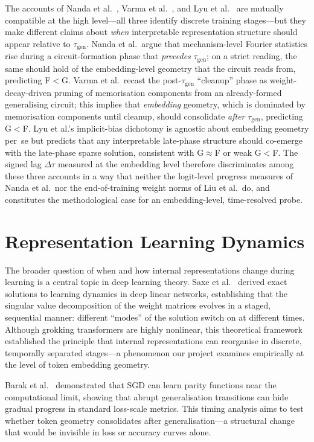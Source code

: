 \documentclass[12pt,openany,a4paper]{book}
\newcommand{\taug}{\tau_{\mathrm{gen}}}
\newcommand{\Dtau}{\Delta\tau}
\begin{document}
The accounts of Nanda et al.\ \cite{nanda2023progress},
Varma et al.\ \cite{varma2023explaining}, and
Lyu et al.\ \cite{lyu2024dichotomy} are mutually compatible at the
high level---all three identify discrete training stages---but they
make different claims about \emph{when} interpretable representation
structure should appear relative to $\taug$.
Nanda et al.\ argue that mechanism-level Fourier statistics rise
during a circuit-formation phase that \emph{precedes} $\taug$;
on a strict reading, the same should hold of the embedding-level
geometry that the circuit reads from, predicting F$<$G.
Varma et al.\ recast the post-$\taug$ ``cleanup'' phase as
weight-decay-driven pruning of memorisation components from an
already-formed generalising circuit; this implies that
\emph{embedding} geometry, which is dominated by memorisation
components until cleanup, should consolidate \emph{after} $\taug$,
predicting G$<$F.
Lyu et al.'s implicit-bias dichotomy is agnostic about embedding
geometry per~se but predicts that any interpretable late-phase
structure should co-emerge with the late-phase sparse solution,
consistent with G$\approx$F or weak G$<$F.
The signed lag $\Dtau$ measured at the embedding level therefore
discriminates among these three accounts in a way that neither the
logit-level progress measures of Nanda et al.\ nor the
end-of-training weight norms of Liu et al.\ do, and constitutes
the methodological case for an embedding-level, time-resolved probe.

\section{Representation Learning Dynamics}

The broader question of when and how internal representations change
during learning is a central topic in deep learning theory.
Saxe et al.\ \cite{saxe2014exact} derived exact solutions to learning
dynamics in deep linear networks, establishing that the singular
value decomposition of the weight matrices evolves in a staged,
sequential manner: different ``modes'' of the solution switch on at
different times.
Although grokking transformers are highly nonlinear, this theoretical
framework established the principle that internal representations
can reorganise in discrete, temporally separated stages---a
phenomenon our project examines empirically at the level of token
embedding geometry.

Barak et al.\ \cite{barak2022hidden} demonstrated that SGD can learn
parity functions near the computational limit, showing that abrupt
generalisation transitions can hide gradual progress in standard
loss-scale metrics.
This timing analysis aims to test whether token geometry consolidates
after generalisation---a structural change that would be invisible
in loss or accuracy curves alone.
\end{document}
